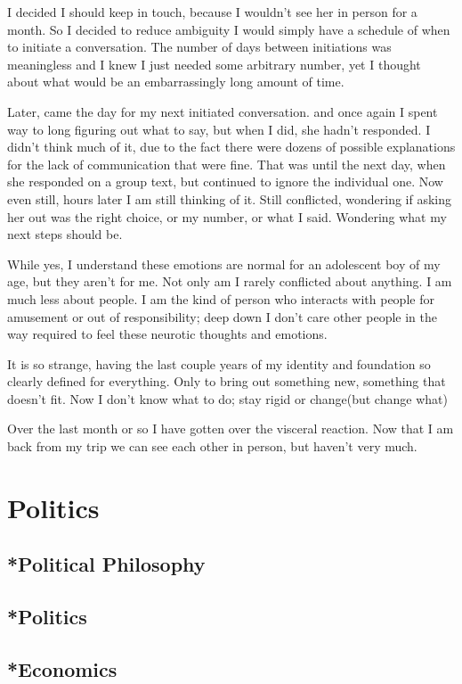 \par I decided I should keep in touch, because I wouldn't see her in person for a month. So I decided to reduce ambiguity I would simply have a schedule of when to initiate a conversation. The number of days between initiations was meaningless and I knew I just needed some arbitrary number, yet I thought about what would be an embarrassingly long amount of time.
\par Later, came the day for my next initiated conversation. and once again I spent way to long figuring out what to say, but when I did, she hadn't responded. I didn't think much of it, due to the fact there were dozens of possible explanations for the lack of communication that were fine. That was until the next day, when she responded on a group text, but continued to ignore the individual one. Now even still, hours later I am still thinking of it. Still conflicted, wondering if asking her out was the right choice, or my number, or what I said. Wondering what my next steps should be. 
\par While yes, I understand these emotions are normal for an adolescent boy of my age, but they aren't for me. Not only am I rarely conflicted about anything. I am much less about people. I am the kind of person who interacts with people for amusement or out of responsibility; deep down I don't care other people in the way required to feel these neurotic thoughts and emotions.
\par It is so strange, having the last couple years of my identity and foundation so clearly defined for everything. Only to bring out something new, something that doesn't fit. Now I don't know what to do; stay rigid or change(but change what) 
\\
\par Over the last month or so I have gotten over the visceral reaction. Now that I am back from my trip we can see each other in person, but haven't very much. 


\chapter{Politics}
\section{*Political Philosophy }
\section{*Politics}
\section{*Economics}
